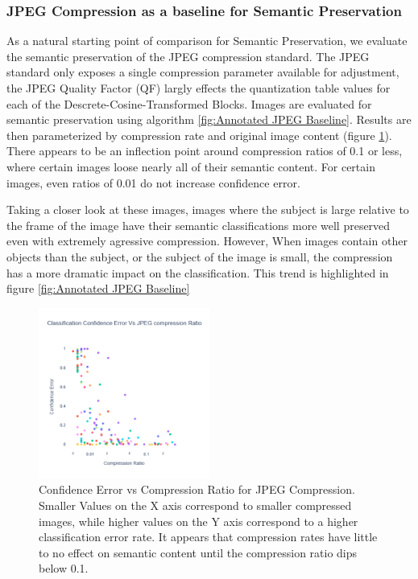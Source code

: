 \subsubsection{JPEG Compression as a baseline for Semantic Preservation}

As a natural starting point of comparison for Semantic Preservation, we evaluate the semantic preservation of the JPEG compression standard.
The JPEG standard only exposes a single compression parameter available for adjustment, the JPEG Quality Factor (QF) largly effects the quantization table values for each of the Descrete-Cosine-Transformed Blocks.
Images are evaluated for semantic preservation using algorithm \ref{fig:Annotated JPEG Baseline}.
Results are then parameterized by compression rate and original image content (figure \ref{fig:Comp vs Ratio JPEG Baseline}). There appears to be an inflection point around compression ratios of 0.1 or less, where certain images loose nearly all of their semantic content. For certain images, even ratios of 0.01 do not increase confidence error.

Taking a closer look at these images, images where the subject is large relative to the frame of the image have their semantic classifications more well preserved even with extremely agressive compression. However, When images contain other objects than the subject, or the subject of the image is small, the compression has a more dramatic impact on the classification. This trend is highlighted in figure \ref{fig:Annotated JPEG Baseline}

\begin{figure}
    \includegraphics[width=0.5\textwidth]{assets/Baseline JPEG Confidence vs Comp Ratio.png}
    \caption{Confidence Error vs Compression Ratio for JPEG Compression. Smaller Values on the X axis correspond to smaller compressed images, while higher values on the Y axis correspond to a higher classification error rate. It appears that compression rates have little to no effect on semantic content until the compression ratio dips below 0.1.}
    \label{fig:Comp vs Ratio JPEG Baseline}
\end{figure}

